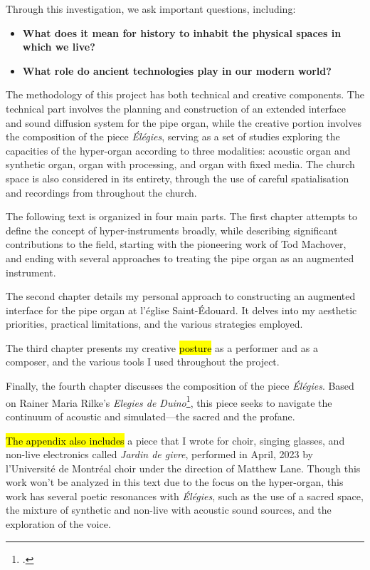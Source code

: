\documentclass[12pt,twoside,maitrise]{dms_ks}
\theoremstyle{definition}
\begin{document}
Through this investigation, we ask important questions, including:
\begin{itemize}
    \item \textbf{What does it mean for history to inhabit the physical spaces in which we live?}
    \item \textbf{What role do ancient technologies play in our modern world?}
\end{itemize}

The methodology of this project has both technical and creative components. 
The technical part involves the planning and construction of an extended interface and sound diffusion system for the pipe organ, while the creative portion involves the composition of the piece \textit{Élégies}, serving as a set of studies exploring the capacities of the hyper-organ according to three modalities: acoustic organ and synthetic organ, organ with processing, and organ with fixed media. 
The church space is also considered in its entirety, through the use of careful spatialisation and recordings from throughout the church.									

The following text is organized in four main parts. 
The first chapter attempts to define the concept of hyper-instruments broadly, while describing significant contributions to the field, starting with the pioneering work of Tod Machover, and ending with several approaches to treating the pipe organ as an augmented instrument.

The second chapter details my personal approach to constructing an augmented interface for the pipe organ at l’église Saint-Édouard. 
It delves into my aesthetic priorities, practical limitations, and the various strategies employed. 

The third chapter presents my creative \hl{posture} as a performer and as a composer, and the various tools I used throughout the project. 

Finally, the fourth chapter discusses the composition of the piece \textit{Élégies}. 
Based on Rainer Maria Rilke's \textit{Elegies de Duino}\footcite{rilke_egies_1986}, this piece seeks to navigate the continuum of acoustic and simulated---the sacred and the profane.

\hl{The appendix also includes} a piece that I wrote for choir, singing glasses, and non-live electronics called \textit{Jardin de givre}, performed in April, 2023 by l'Université de Montréal choir under the direction of Matthew Lane. Though this work won't be analyzed in this text due to the focus on the hyper-organ, this work has several poetic resonances with \textit{Élégies}, such as the use of a sacred space, the mixture of synthetic and non-live with acoustic sound sources, and the exploration of the voice.
\end{document}

